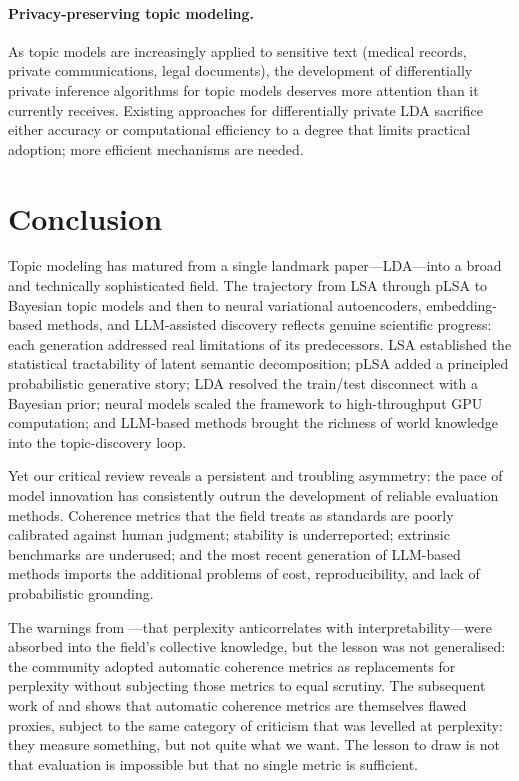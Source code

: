 \documentclass[11pt,a4paper]{article}
\begin{document}
\paragraph{Privacy-preserving topic modeling.}
As topic models are increasingly applied to sensitive text
(medical records, private communications, legal documents),
the development of differentially private inference algorithms
for topic models deserves more attention than it currently receives.
Existing approaches for differentially private LDA sacrifice either
accuracy or computational efficiency to a degree that limits
practical adoption; more efficient mechanisms are needed.

\section{Conclusion}
\label{sec:conclusion}

Topic modeling has matured from a single landmark paper---LDA---into
a broad and technically sophisticated field.
The trajectory from LSA through pLSA to Bayesian topic models and
then to neural variational autoencoders, embedding-based methods,
and LLM-assisted discovery reflects genuine scientific progress:
each generation addressed real limitations of its predecessors.
LSA established the statistical tractability of latent semantic
decomposition; pLSA added a principled probabilistic generative story;
LDA resolved the train/test disconnect with a Bayesian prior; neural
models scaled the framework to high-throughput GPU computation; and
LLM-based methods brought the richness of world knowledge into the
topic-discovery loop.

Yet our critical review reveals a persistent and troubling asymmetry:
the pace of model innovation has consistently outrun the development
of reliable evaluation methods.
Coherence metrics that the field treats as standards are poorly
calibrated against human judgment; stability is underreported;
extrinsic benchmarks are underused; and the most recent generation
of LLM-based methods imports the additional problems of cost,
reproducibility, and lack of probabilistic grounding.

The warnings from \textcite{chang2009reading}---that perplexity
anticorrelates with interpretability---were absorbed into the field's
collective knowledge, but the lesson was not generalised: the community
adopted automatic coherence metrics as replacements for perplexity
without subjecting those metrics to equal scrutiny.
The subsequent work of \textcite{hoyle2021automated} and
\textcite{doogan2021twaddle} shows that automatic coherence metrics are
themselves flawed proxies, subject to the same category of criticism
that was levelled at perplexity: they measure something, but not quite
what we want.
The lesson to draw is not that evaluation is impossible but that no
single metric is sufficient.
\end{document}
